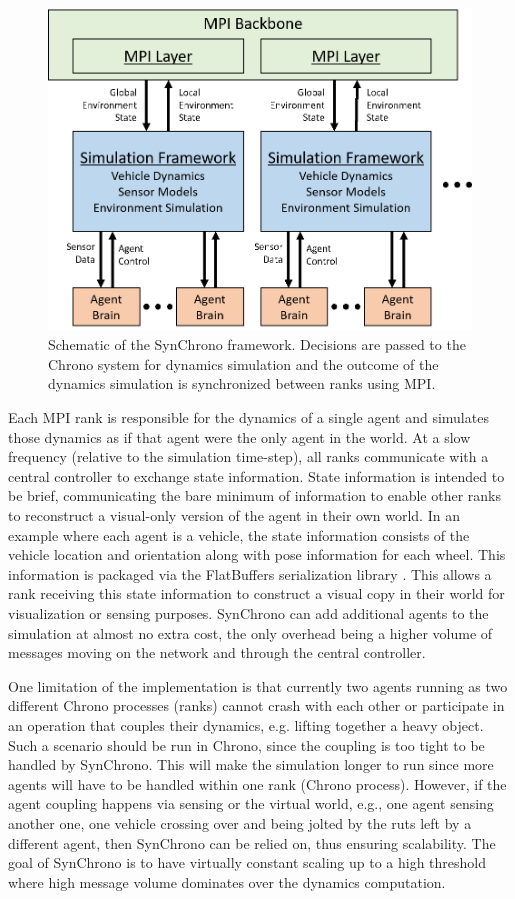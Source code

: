 \documentclass[12pt,twocolumn]{article}
\begin{document}
\begin{figure}
	\centering
	\includegraphics[width=\columnwidth]{Figs/MPI-schematic.png}
	\caption{{\small Schematic of the SynChrono framework. Decisions are passed to the Chrono system for dynamics simulation and the outcome of the dynamics simulation is synchronized between ranks using MPI.}}   
	\label{fig:mpischematic}
\end{figure}

Each MPI rank is responsible for the dynamics of a single agent and simulates those dynamics as if that agent were the only agent in the world. At a slow frequency (relative to the simulation time-step), all ranks communicate with a central controller to exchange state information. State information is intended to be brief, communicating the bare minimum of information to enable other ranks to reconstruct a visual-only version of the agent in their own world. In an example where each agent is a vehicle, the state information consists of the vehicle location and orientation along with pose information for each wheel. This information is packaged via the FlatBuffers serialization library \cite{flatbuffers}. This allows a rank receiving this state information to construct a visual copy in their world for visualization or sensing purposes. SynChrono can add additional agents to the simulation at almost no extra cost, the only overhead being a higher volume of messages moving on the network and through the central controller. 

One limitation of the implementation is that currently two agents running as two different Chrono processes (ranks) cannot crash with each other or participate in an operation that couples their dynamics, e.g. lifting together a heavy object. Such a scenario should be run in Chrono, since the coupling is too tight to be handled by SynChrono. This will make the simulation longer to run since more agents will have to be handled within one rank (Chrono process). However, if the agent coupling happens via sensing or the virtual world, e.g., one agent sensing another one, one vehicle crossing over and being jolted by the ruts left by a different agent, then SynChrono can be relied on, thus ensuring scalability. The goal of SynChrono is to have virtually constant scaling up to a high threshold where high message volume dominates over the dynamics computation. 
\end{document}
